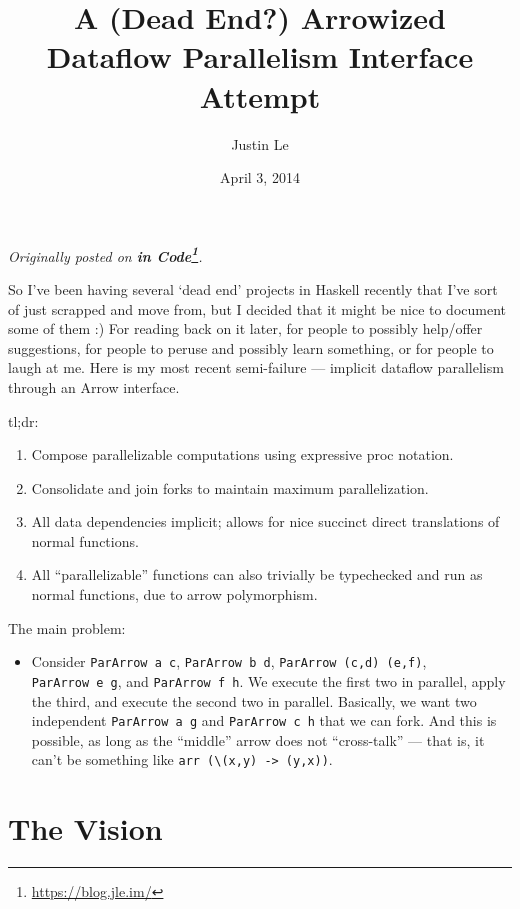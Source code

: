 \documentclass[]{article}
\title{A (Dead End?) Arrowized Dataflow Parallelism Interface Attempt}
\author{Justin Le}
\date{April 3, 2014}
\renewcommand{\href}[2]{#2\footnote{\url{#1}}}
\begin{document}
\maketitle

\emph{Originally posted on \textbf{\href{https://blog.jle.im/}{in
Code}}.}

So I've been having several `dead end' projects in Haskell recently that
I've sort of just scrapped and move from, but I decided that it might be
nice to document some of them :) For reading back on it later, for
people to possibly help/offer suggestions, for people to peruse and
possibly learn something, or for people to laugh at me. Here is my most
recent semi-failure --- implicit dataflow parallelism through an Arrow
interface.

tl;dr:

\begin{enumerate}
\def\labelenumi{\arabic{enumi}.}
\tightlist
\item
  Compose parallelizable computations using expressive proc notation.
\item
  Consolidate and join forks to maintain maximum parallelization.
\item
  All data dependencies implicit; allows for nice succinct direct
  translations of normal functions.
\item
  All ``parallelizable'' functions can also trivially be typechecked and
  run as normal functions, due to arrow polymorphism.
\end{enumerate}

The main problem:

\begin{itemize}
\tightlist
\item
  Consider \texttt{ParArrow\ a\ c}, \texttt{ParArrow\ b\ d},
  \texttt{ParArrow\ (c,d)\ (e,f)}, \texttt{ParArrow\ e\ g}, and
  \texttt{ParArrow\ f\ h}. We execute the first two in parallel, apply
  the third, and execute the second two in parallel. Basically, we want
  two independent \texttt{ParArrow\ a\ g} and \texttt{ParArrow\ c\ h}
  that we can fork. And this is possible, as long as the ``middle''
  arrow does not ``cross-talk'' --- that is, it can't be something like
  \texttt{arr\ (\textbackslash{}(x,y)\ -\textgreater{}\ (y,x))}.
\end{itemize}

\section{The Vision}\label{the-vision}
\end{document}
